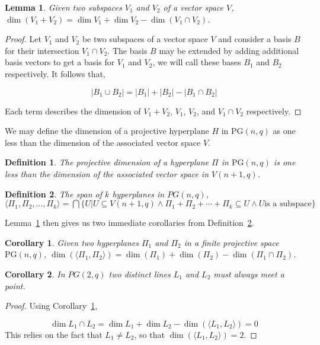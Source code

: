 \documentclass{article}
\newtheorem{lemma}{Lemma}
\newtheorem{corollary}{Corollary}
\newtheorem{definition}{Definition}
\newcommand{\PG}{\mathrm{PG}}
\begin{document}
    \begin{lemma}\label{lemma:2}
        Given two subspaces \(V_1\) and \(V_2\) of a vector space \(V\), \(\dim (V_1 + V_2) = \dim V_1 + \dim V_2 - \dim (V_1 \cap V_2)\).
    \end{lemma}

    \begin{proof}
        Let \(V_1\) and \(V_2\) be two subspaces of a vector space \(V\) and consider a basis \(B\) for their intersection \(V_1 \cap V_2\). The basis \(B\) may be extended by adding additional basis vectors to get a basis for \(V_1\) and \(V_2\), we will call these bases \(B_1\) and \(B_2\) respectively.
        It follows that,

        \begin{equation*}
            | B_1 \cup B_2 | = |B_1| + |B_2| - |B_1 \cap B_2|
        \end{equation*}

        Each term describes the dimension of \(V_1 + V_2\), \(V_1\), \(V_2\), and \(V_1 \cap V_2\) respectively.
    \end{proof}

    We may define the dimension of a projective hyperplane \(H\) in \(\PG(n, q)\) as one less than the dimension of the associated vector space \(V\).
    \begin{definition}
        The projective dimension of a hyperplane \(\Pi\) in \(\PG(n, q)\) is one less than the dimension of the associated vector space in \(V(n + 1, q)\).
    \end{definition}

    \begin{definition}\label{def:1}
        The span of \(k\) hyperplanes in \(PG(n, q)\), \(\langle \Pi_1, \Pi_2, \ldots, \Pi_k \rangle = \bigcap \{U  | U \subseteq V(n + 1, q) \land \Pi_1 + \Pi_2 + \cdots + \Pi_k \subseteq U \land U \text{is a subspace}\}\)
    \end{definition}
    
    Lemma~\ref{lemma:2} then gives us two immediate corollaries from Definition~\ref{def:1}.
    \begin{corollary}\label{cor:1}
        Given two hyperplanes \(\Pi_1\) and \(\Pi_2\) in a finite projective space \(\PG(n, q)\), \(\dim(\langle \Pi_1, \Pi_2 \rangle) = \dim (\Pi_1) + \dim (\Pi_2) - \dim (\Pi_1 \cap \Pi_2)\).
    \end{corollary}

    \begin{corollary}
        In \(PG(2, q)\) two distinct lines \(L_1\) and \(L_2\) must always meet a point.
    \end{corollary}
    \begin{proof}
        Using Corollary~\ref{cor:1},

        \begin{equation*}
            \dim L_1 \cap L_2 = \dim L_1 + \dim L_2 - \dim (\langle L_1, L_2 \rangle) = 0
        \end{equation*}
        This relies on the fact that \(L_1 \neq L_2\), so that \(\dim (\langle L_1, L_2 \rangle) = 2\).
    \end{proof}
\end{document}
